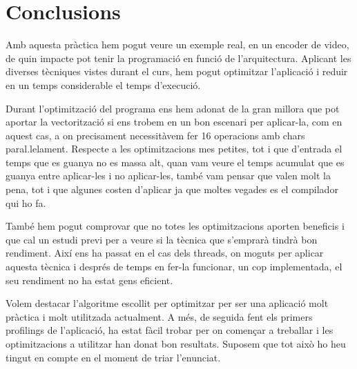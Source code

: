 \chapter{Conclusions}

Amb aquesta pràctica hem pogut veure un exemple real, en un encoder de video, de quin impacte pot tenir la programació en funció de l'arquitectura. Aplicant les diverses tècniques vistes durant el curs, hem pogut optimitzar l'aplicació i reduir en un temps considerable el temps d'execució.

Durant l'optimització del programa ens hem adonat de la gran millora que pot aportar la vectorització si ens trobem en un bon escenari per aplicar-la, com en aquest cas, a on precisament necessitàvem fer 16 operacions amb chars paral.lelament. Respecte a les optimitzacions mes petites, tot i que d'entrada el temps que es guanya no es massa alt, quan vam veure el temps acumulat que es guanya entre aplicar-les i no aplicar-les, també vam pensar que valen molt la pena, tot i que algunes costen d'aplicar ja que moltes vegades es el compilador qui ho fa.

També hem pogut comprovar que no totes les optimitzacions aporten beneficis i que cal un estudi previ per a veure si la tècnica que s'emprarà tindrà bon rendiment. Així ens ha passat en el cas dels threads, on moguts per aplicar aquesta tècnica i després de temps en fer-la funcionar, un cop implementada, el seu rendiment no ha estat gens eficient. 

Volem destacar l'algoritme escollit per optimitzar per ser una aplicació molt pràctica i molt utilitzada actualment. A més, de seguida fent els primers profilings de l'aplicació, ha estat fàcil trobar per on començar a treballar i les optimitzacions a utilitzar han donat bon resultats. Suposem que tot això ho heu tingut en compte en el moment de triar l'enunciat.

